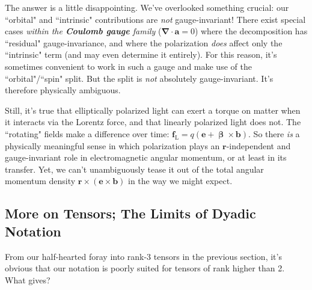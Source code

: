 \documentclass[12pt]{article}
\renewcommand{\vv}[1]{\mathbf{#1}}
\newcommand{\vvbeta}{\bm{\upbeta}}
\newcommand{\del}{\boldsymbol{\nabla}}
\begin{document}
The answer is a little disappointing. We've overlooked something crucial: our ``orbital" and ``intrinsic" contributions are \emph{not} gauge-invariant! There exist special cases \emph{within the \textbf{Coulomb gauge} family} (${\del \cdot \vv a = 0}$) where the decomposition has ``residual" gauge-invariance, and where the polarization \emph{does} affect only the ``intrinsic" term (and may even determine it entirely). For this reason, it's sometimes convenient to work in such a gauge and make use of the ``orbital"/``spin" split. But the split is \emph{not} absolutely gauge-invariant. It's therefore physically ambiguous.

Still, it's true that elliptically polarized light can exert a torque on matter when it interacts via the Lorentz force, and that linearly polarized light does not. The ``rotating" fields make a difference over time: $\vv f_{\textrm{L}} = q ( \vv e + \vvbeta \times \vv b )$. So there \emph{is} a physically meaningful sense in which polarization plays an $\vv r$-independent and gauge-invariant role in electromagnetic angular momentum, or at least in its transfer. Yet, we can't unambiguously tease it out of the total angular momentum density $\vv r \times (\vv e \times \vv b)$ in the way we might expect.


\subsection{More on Tensors; The Limits of Dyadic Notation}\label{ssec:index}

From our half-hearted foray into rank-3 tensors in the previous section, it's obvious that our notation is poorly suited for tensors of rank higher than 2. What gives?
\end{document}
